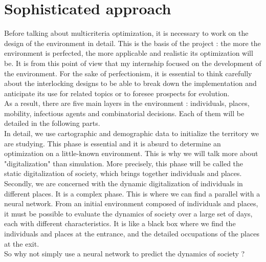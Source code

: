 \section*{Sophisticated approach}

Before talking about multicriteria optimization, it is necessary to work on the design of the environment in detail. This is the basis of the project : the more the environment is perfected, the more applicable and realistic its optimization will be. It is from this point of view that my internship focused on the development of the environment. For the sake of perfectionism, it is essential to think carefully about the interlocking designs to be able to break down the implementation and anticipate its use for related topics or to foresee prospects for evolution.\\

As a result, there are five main layers in the environment : individuals, places, mobility, infectious agents and combinatorial decisions. Each of them will be detailed in the following parts.\\

In detail, we use cartographic and demographic data to initialize the territory we are studying. This phase is essential and it is absurd to determine an optimization on a little-known environment. This is why we will talk more about "digitalization" than simulation. More precisely, this phase will be called the static digitalization of society, which brings together individuals and places.\\

Secondly, we are concerned with the dynamic digitalization of individuals in different places. It is a complex phase. This is where we can find a parallel with a neural network. From an initial environment composed of individuals and places, it must be possible to evaluate the dynamics of society over a large set of days, each with different characteristics. It is like a black box where we find the individuals and places at the entrance, and the detailed occupations of the places at the exit.\\

So why not simply use a neural network to predict the dynamics of society ?\\

